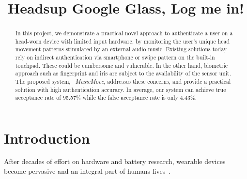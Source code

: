 \documentclass{sigchi}
\begin{document}
\title{Headsup Google Glass, Log me in!}
\maketitle
\newcommand{\systemname}{{\em MusicMove}}
\begin{abstract}
In this project, we demonstrate a practical novel approach to authenticate a user on a head-worn device with limited input hardware, by monitoring the user's unique head movement patterns stimulated by an external audio music. Existing solutions today rely on indirect authentication via smartphone or swipe pattern on the built-in touchpad. These could be cumbersome and vulnerable. In the other hand, biometric approach such as fingerprint and iris are subject to the availability of the sensor unit. The proposed system, ~\systemname, addresses these concerns, and provide a practical solution with high authentication accuracy. In average, our system can achieve true acceptance rate of 95.57\% while the false acceptance rate is only 4.43\%.
\end{abstract}


\section{Introduction}
After decades of effort on hardware and battery research, wearable devices become pervasive and an integral part of humans lives~\cite{googleglass,smartwatch,fitbit}. 
 
\end{document}
